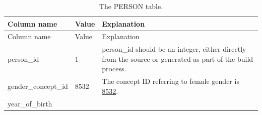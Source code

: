 \documentclass[11pt]{book}
\begin{document}
\begin{longtable}[]{@{}lll@{}}
\caption{\label{tab:person} The PERSON table.}\tabularnewline
\toprule
\begin{minipage}[b]{0.28\columnwidth}\raggedright\strut
Column name\strut
\end{minipage} & \begin{minipage}[b]{0.16\columnwidth}\raggedright\strut
Value\strut
\end{minipage} & \begin{minipage}[b]{0.48\columnwidth}\raggedright\strut
Explanation\strut
\end{minipage}\tabularnewline
\midrule
\endfirsthead
\toprule
\begin{minipage}[b]{0.28\columnwidth}\raggedright\strut
Column name\strut
\end{minipage} & \begin{minipage}[b]{0.16\columnwidth}\raggedright\strut
Value\strut
\end{minipage} & \begin{minipage}[b]{0.48\columnwidth}\raggedright\strut
Explanation\strut
\end{minipage}\tabularnewline
\midrule
\endhead
\begin{minipage}[t]{0.28\columnwidth}\raggedright\strut
person\_id\strut
\end{minipage} & \begin{minipage}[t]{0.16\columnwidth}\raggedright\strut
1\strut
\end{minipage} & \begin{minipage}[t]{0.48\columnwidth}\raggedright\strut
person\_id should be an integer, either directly from the source or
generated as part of the build process.\strut
\end{minipage}\tabularnewline
\begin{minipage}[t]{0.28\columnwidth}\raggedright\strut
gender\_concept\_id\strut
\end{minipage} & \begin{minipage}[t]{0.16\columnwidth}\raggedright\strut
8532\strut
\end{minipage} & \begin{minipage}[t]{0.48\columnwidth}\raggedright\strut
The concept ID referring to female gender is
\href{http://athena.ohdsi.org/search-terms/terms/8532}{8532}.\strut
\end{minipage}\tabularnewline
\begin{minipage}[t]{0.28\columnwidth}\raggedright\strut
year\_of\_birth\strut
\end{minipage} & \begin{minipage}[t]{0.16\columnwidth}\raggedright\strut

\end{minipage}
\end{longtable}
\end{document}
